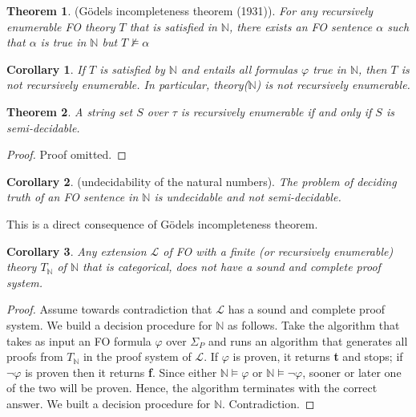\documentclass[10pt,a4paper]{article}
\theoremstyle{definition}
\newtheorem{theorem}{Theorem}
\newtheorem{corollary}{Corollary}[theorem]
\begin{document}
\begin{theorem}
(G\"{o}dels incompleteness theorem (1931)). \textit{For any recursively enumerable FO theory $T$ that is satisfied in $\mathbb{N}$, there exists an FO sentence $\alpha$ such that $\alpha$ is true in $\mathbb{N}$ but $T \not\models\alpha$}
\end{theorem}

\begin{corollary} 
\textit{If $T$ is satisfied by $\mathbb{N}$ and entails all formulas $\varphi$ true in $\mathbb{N}$, then $T$ is not recursively enumerable. In particular, theory($\mathbb{N}$) is not recursively enumerable.}
\end{corollary}

\begin{theorem}
\textit{A string set $S$ over $\tau$ is recursively enumerable if and only if $S$ is semi-decidable.}
\end{theorem}

\begin{proof}
Proof omitted.
\end{proof}


\begin{corollary} 
(undecidability of the natural numbers). \textit{ The problem of deciding truth of an FO sentence in $\mathbb{N}$ is undecidable and not semi-decidable.}
\end{corollary}

This is a direct consequence of G\"{o}dels incompleteness theorem.

\begin{corollary} 
\textit{ Any extension $\mathcal{L}$ of FO with a finite (or recursively enumerable) theory $T_\mathbb{N}$ of $\mathbb{N}$ that is categorical, does not have a sound and complete proof system.}
\end{corollary}

\begin{proof}
Assume towards contradiction that $\mathcal{L}$ has a sound and complete proof system. We build a decision procedure for $\mathbb{N}$ as follows. Take the algorithm that takes as input an FO formula $\varphi$ over $\Sigma_P$ and runs an algorithm that generates all proofs from $T_\mathbb{N}$ in the proof system of $\mathcal{L}$. If $\varphi$ is proven, it returns \textbf{t} and stops; if $\lnot\varphi$ is proven then it returns \textbf{f}. Since either $\mathbb{N} \models \varphi$ or $\mathbb{N} \models \lnot \varphi$, sooner or later one of the two will be proven. Hence, the algorithm terminates with the correct answer. We built a decision procedure for $\mathbb{N}$. Contradiction.
\end{proof}
\end{document}
